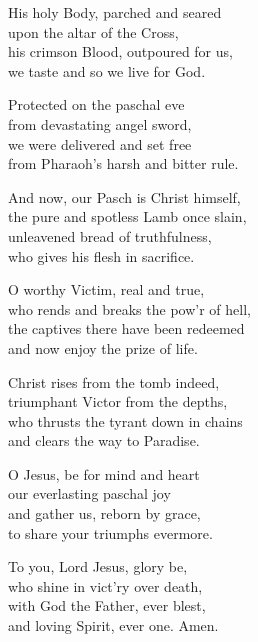 
His holy Body, parched and seared\\
upon the altar of the Cross,\\
his crimson Blood, outpoured for us,\\
we taste and so we live for God.

Protected on the paschal eve\\
from devastating angel sword,\\
we were delivered and set free\\
from Pharaoh's harsh and bitter rule.

And now, our Pasch is Christ himself,\\
the pure and spotless Lamb once slain,\\
unleavened bread of truthfulness,\\
who gives his flesh in sacrifice.

O worthy Victim, real and true,\\
who rends and breaks the pow'r of hell,\\
the captives there have been redeemed\\
and now enjoy the prize of life.

Christ rises from the tomb indeed,\\
triumphant Victor from the depths,\\
who thrusts the tyrant down in chains\\
and clears the way to Paradise.

O Jesus, be for mind and heart\\
our everlasting paschal joy\\
and gather us, reborn by grace,\\
to share your triumphs evermore.

To you, Lord Jesus, glory be,\\
who shine in vict'ry over death,\\
with God the Father, ever blest,\\
and loving Spirit, ever one. Amen.